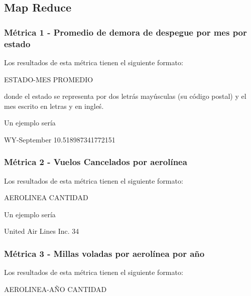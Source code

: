 \documentclass[a4paper,10pt]{article}
\begin{document}
    \subsection{Map Reduce}
        \subsubsection{Métrica 1 - Promedio de demora de despegue por mes por estado}
            Los resultados de esta métrica tienen el siguiente formato:\\
            \begin{center}
                ESTADO-MES PROMEDIO \\
            \end{center}
            donde el estado se representa por dos letrás mayúsculas (su código postal) y el mes escrito en letras y en ingleś.

            Un ejemplo sería\\
            \begin{center}
                WY-September    10.518987341772151\\
            \end{center}

        \subsubsection{Métrica 2 - Vuelos Cancelados por aerolínea}
            Los resultados de esta métrica tienen el siguiente formato:\\
            \begin{center}
                AEROLINEA CANTIDAD\\
            \end{center}

            Un ejemplo sería\\
            \begin{center}
               United Air Lines Inc.   34\\
            \end{center}

        \subsubsection{Métrica 3 - Millas voladas por aerolínea por año}
            Los resultados de esta métrica tienen el siguiente formato:\\
            \begin{center}
                AEROLINEA-AÑO CANTIDAD\\
            \end{center}
\end{document}
